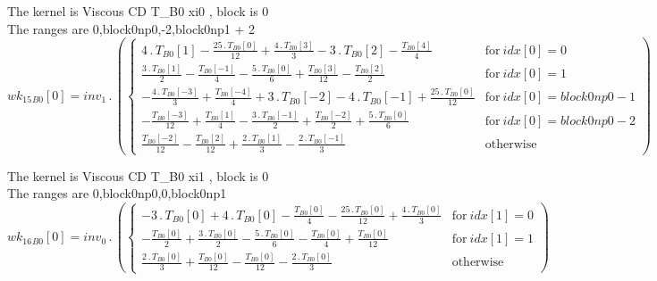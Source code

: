 \documentclass{article}
\begin{document}
\noindent The kernel is Viscous CD T_B0 xi0 , block is 0\\\noindent The ranges are 0,block0np0,-2,block0np1 + 2\\\begin{dmath}{wk_{15}{_{B0}}}[{0}] = inv_1 \,.\, \left(\begin{cases} 4 \,.\, {T{_{B0}}}[{1}] - \frac{25 \,.\, {T{_{B0}}}[{0}]}{12} + \frac{4 \,.\, {T{_{B0}}}[{3}]}{3} - 3 \,.\, {T{_{B0}}}[{2}] - \frac{{T{_{B0}}}[{4}]}{4} & \text{for}\: {idx}[{0}] = 0 
\\\frac{3 \,.\, {T{_{B0}}}[{1}]}{2} - \frac{{T{_{B0}}}[{-1}]}{4} - \frac{5 \,.\, {T{_{B0}}}[{0}]}{6} + \frac{{T{_{B0}}}[{3}]}{12} - \frac{{T{_{B0}}}[{2}]}{2} & \text{for}\: {idx}[{0}] = 1 \\- \frac{4 \,.\, {T{_{B0}}}[{-3}]}{3} + 
\frac{{T{_{B0}}}[{-4}]}{4} + 3 \,.\, {T{_{B0}}}[{-2}] - 4 \,.\, {T{_{B0}}}[{-1}] + \frac{25 \,.\, {T{_{B0}}}[{0}]}{12} & \text{for}\: {idx}[{0}] = block0np0 - 1 \\- \frac{{T{_{B0}}}[{-3}]}{12} + \frac{{T{_{B0}}}[{1}]}{4} - \frac{3 \,.\, 
{T{_{B0}}}[{-1}]}{2} + \frac{{T{_{B0}}}[{-2}]}{2} + \frac{5 \,.\, {T{_{B0}}}[{0}]}{6} & \text{for}\: {idx}[{0}] = block0np0 - 2 \\\frac{{T{_{B0}}}[{-2}]}{12} - \frac{{T{_{B0}}}[{2}]}{12} + \frac{2 \,.\, {T{_{B0}}}[{1}]}{3} - \frac{2 \,.\, 
{T{_{B0}}}[{-1}]}{3} & \text{otherwise} \end{cases}\right)\end{dmath}

\noindent The kernel is Viscous CD T_B0 xi1 , block is 0\\\noindent The ranges are 0,block0np0,0,block0np1\\\begin{dmath}{wk_{16}{_{B0}}}[{0}] = inv_0 \,.\, \left(\begin{cases} - 3 \,.\, {T{_{B0}}}[{0}] + 4 \,.\, {T{_{B0}}}[{0}] - \frac{{T{_{B0}}}[{0}]}{4} - \frac{25 \,.\, {T{_{B0}}}[{0}]}{12} + \frac{4 \,.\, {T{_{B0}}}[{0}]}{3} & \text{for}\: {idx}[{1}] = 
0 \\- \frac{{T{_{B0}}}[{0}]}{2} + \frac{3 \,.\, {T{_{B0}}}[{0}]}{2} - \frac{5 \,.\, {T{_{B0}}}[{0}]}{6} - \frac{{T{_{B0}}}[{0}]}{4} + \frac{{T{_{B0}}}[{0}]}{12} & \text{for}\: {idx}[{1}] = 1 \\\frac{2 \,.\, {T{_{B0}}}[{0}]}{3} + 
\frac{{T{_{B0}}}[{0}]}{12} - \frac{{T{_{B0}}}[{0}]}{12} - \frac{2 \,.\, {T{_{B0}}}[{0}]}{3} & \text{otherwise} \end{cases}\right)\end{dmath}
\end{document}
